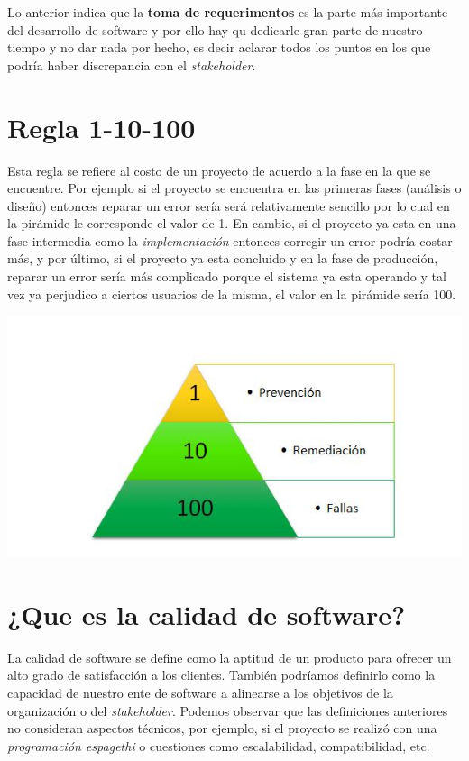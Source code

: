 \documentclass{mylib/reporteCorto}
\begin{document}
Lo anterior indica que la \textbf{toma de requerimentos} es la parte más importante del desarrollo de software y por ello hay qu dedicarle gran parte de nuestro tiempo y no dar nada por hecho, es decir aclarar todos los puntos en los que podría haber discrepancia con el \textit{stakeholder}.

\section*{Regla 1-10-100}

Esta regla se refiere al costo de un proyecto de acuerdo a la fase en la que se encuentre. Por ejemplo si el proyecto se encuentra en las primeras fases (análisis o diseño) entonces reparar un error sería será relativamente sencillo por lo cual en la pirámide le corresponde el valor de 1. En cambio, si el proyecto ya esta en una fase intermedia como la \textit{implementación} entonces corregir un error podría costar más, y por último, si el proyecto ya esta concluido y en la fase de producción, reparar un error sería más complicado porque el sistema ya esta operando y tal vez ya perjudico a ciertos usuarios de la misma, el valor en la pirámide sería 100.

\begin{center}
	\includegraphics[scale=0.5]{img/admin/regla-1-10-100}
\end{center}

\section*{¿Que es la calidad de software?}

La calidad de software se define como la aptitud de un producto para ofrecer un alto grado de satisfacción a los clientes. También podríamos definirlo como la capacidad de nuestro ente de software a alinearse a los objetivos de la organización o del \textit{stakeholder}. Podemos observar que las definiciones anteriores no consideran aspectos técnicos, por ejemplo, si el proyecto se realizó con una \textit{programación espagethi} o cuestiones como escalabilidad, compatibilidad, etc.
\end{document}
